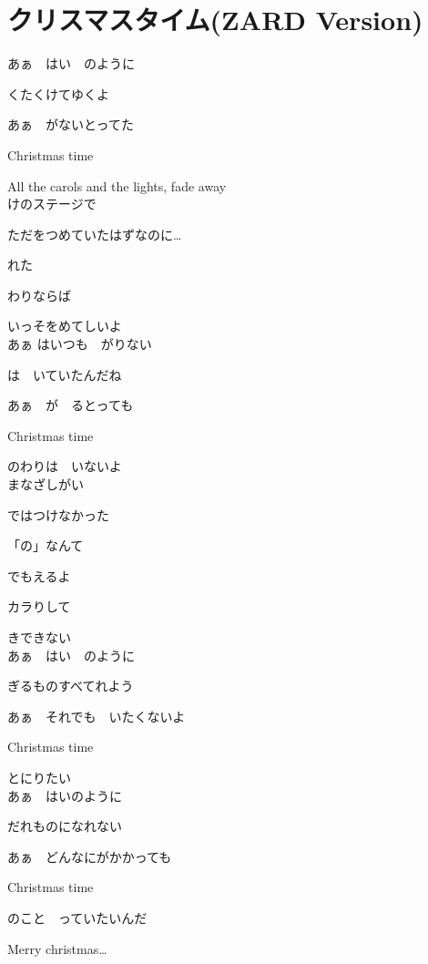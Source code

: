 \section{ クリスマスタイム(ZARD Version)}
\large{

あぁ　はい　のように

くたくけてゆくよ

あぁ　がないとってた

Christmas time

All the carols and the lights, fade away
\\

けのステージで

ただをつめていたはずなのに…

れた

わりならば

いっそをめてしいよ
\\

あぁ はいつも　がりない

は　いていたんだね

あぁ　が　るとっても

Christmas time

のわりは　いないよ
\\

まなざしがい

ではつけなかった

「の」なんて

でもえるよ

カラりして

きできない
\\

あぁ　はい　のように

ぎるものすべてれよう

あぁ　それでも　いたくないよ

Christmas time

とにりたい
\\

あぁ　はいのように

だれものになれない

あぁ　どんなにがかかっても

Christmas time

のこと　っていたいんだ

Merry christmas…

}